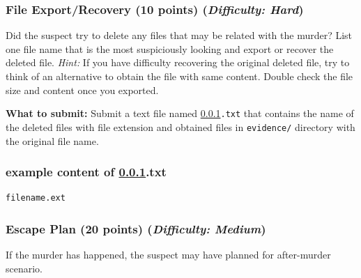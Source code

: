 \documentclass[letterpaper,12pt]{report}
\begin{document}
\subsubsection{File Export/Recovery (10 points)    \hfill\rm\normalsize (\emph{Difficulty: Hard})}
\label{sec:file_export}
Did the suspect try to delete any files that may be related with the murder?  List one file name that is the most suspiciously looking and export or recover the deleted file. \textit{Hint:} If you have difficulty recovering the original deleted file, try to think of an alternative to obtain the file with same content. Double check the file size and content once you exported.

\medskip 
\textbf{What to submit:} Submit a text file named \texttt{\ref{sec:file_export}.txt} that contains the name of the deleted files with file extension and obtained files in \texttt{evidence/} directory with the original file name.

\subsubsection*{example content of {\ref{sec:file_export}.txt}}
\begin{mdframed}
\begin{Verbatim}
filename.ext
\end{Verbatim}
\end{mdframed}

\subsubsection{Escape Plan (20 points)    \hfill\rm\normalsize (\emph{Difficulty: Medium})}
\label{sec:escape_plan}
If the murder has happened, the suspect may have planned for after-murder scenario.
\end{document}
